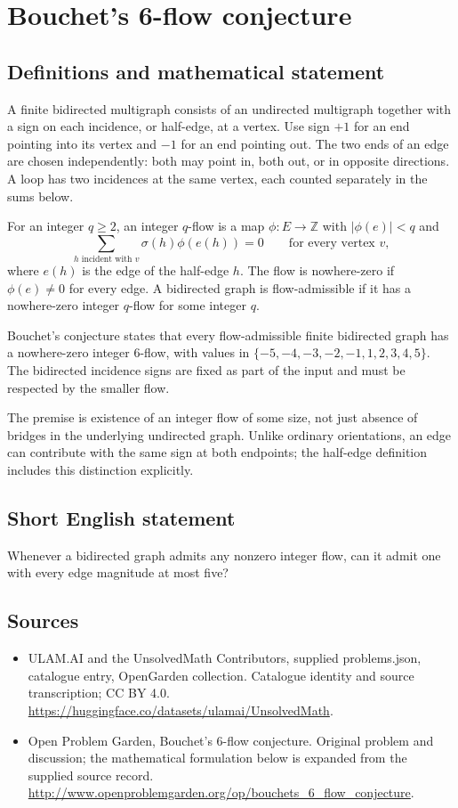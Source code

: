 \documentclass[11pt,a4paper]{article}
\begin{document}
\section*{Bouchet's 6-flow conjecture}\label{statement}

\subsection{Definitions and mathematical statement}
A finite bidirected multigraph consists
of an undirected multigraph together
with a sign on each incidence,
or half-edge, at a vertex. Use
sign $+1$ for an end pointing
into its vertex and $-1$ for
an end pointing out. The two
ends of an edge are chosen
independently: both may point in,
both out, or in opposite directions.
A loop has two incidences at
the same vertex, each counted
separately in the sums below.

For an integer $q\geq2$, an integer
$q$-flow is a map $\phi:E\to\mathbb Z$
with $|\phi(e)|<q$ and
\[
 \sum_{h\text{ incident with }v}
       \sigma(h)\phi(e(h))=0
 \qquad\text{for every vertex }v,
\]
where $e(h)$ is the edge of
the half-edge $h$. The flow
is nowhere-zero if $\phi(e)\neq0$
for every edge. A bidirected
graph is flow-admissible if it
has a nowhere-zero integer
$q$-flow for some integer $q$.

Bouchet's conjecture states that
every flow-admissible finite
bidirected graph has a nowhere-zero
integer $6$-flow, with values
in $\{-5,-4,-3,-2,-1,1,2,3,4,5\}$.
The bidirected incidence signs
are fixed as part of the
input and must be respected
by the smaller flow.

The premise is existence of
an integer flow of some size,
not just absence of bridges
in the underlying undirected
graph. Unlike ordinary orientations,
an edge can contribute with
the same sign at both endpoints;
the half-edge definition includes
this distinction explicitly.
\subsection{Short English statement}
Whenever a bidirected graph admits any nonzero integer flow, can it admit one with every edge magnitude at most five?
\subsection{Sources}
\begin{itemize}
\item[S1] ULAM.AI and the UnsolvedMath Contributors, supplied problems.json, catalogue entry, OpenGarden collection. Catalogue identity and source transcription; CC BY 4.0.
\url{https://huggingface.co/datasets/ulamai/UnsolvedMath}.
\item[S2] Open Problem Garden, Bouchet's 6-flow conjecture. Original problem and discussion; the mathematical formulation below is expanded from the supplied source record.
\url{http://www.openproblemgarden.org/op/bouchets_6_flow_conjecture}.
\end{itemize}
\end{document}
